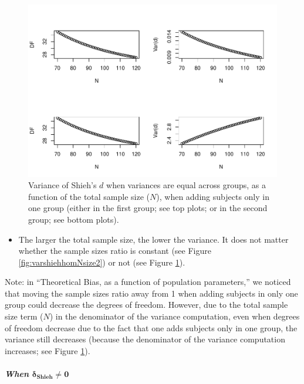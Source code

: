 \documentclass[
  english,
  man,mask]{apa6}
\providecommand{\tightlist}{%
  \setlength{\itemsep}{0pt}\setlength{\parskip}{0pt}}
\let\oldsubparagraph\subparagraph
\renewcommand{\subparagraph}[1]{\oldsubparagraph{#1}\mbox{}}
\begin{document}
\begin{figure}
\centering
\includegraphics{Theoretical-Bias-of-all-estimators-as-a-function-of-population-parameters_files/figure-latex/varshiehhomNsize4-1.pdf}
\caption{\label{fig:varshiehhomNsize4}Variance of Shieh's \(d\) when variances are equal across groups, as a function of the total sample size (\(N\)), when adding subjects only in one group (either in the first group; see top plots; or in the second group; see bottom plots).}
\end{figure}

\begin{itemize}
\tightlist
\item
  The larger the total sample size, the lower the variance. It does not matter whether the sample sizes ratio is constant (see Figure \ref{fig:varshiehhomNsize2}) or not (see Figure \ref{fig:varshiehhomNsize4}).
\end{itemize}

Note: in ``Theoretical Bias, as a function of population parameters,'' we noticed that moving the sample sizes ratio away from 1 when adding subjects in only one group could decrease the degrees of freedom. However, due to the total sample size term (\(N\)) in the denominator of the variance computation, even when degrees of freedom decrease due to the fact that one adds subjects only in one group, the variance still decreases (because the denominator of the variance computation increases; see Figure \ref{fig:varshiehhomNsize4}).

\hypertarget{when-bmdelta_shieh-neq-0}{%
\subparagraph{\texorpdfstring{When \(\bm{\delta_{Shieh} \neq 0}\)}{When \textbackslash bm\{\textbackslash delta\_\{Shieh\} \textbackslash neq 0\}}}\label{when-bmdelta_shieh-neq-0}}
\end{document}
